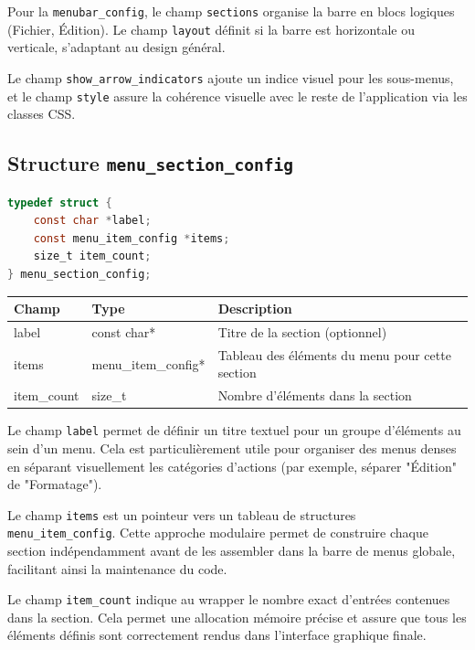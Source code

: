 Pour la \texttt{menubar\_config}, le champ \texttt{sections} organise la barre en blocs logiques (Fichier, Édition). Le champ \texttt{layout} définit si la barre est horizontale ou verticale, s'adaptant au design général. 

Le champ \texttt{show\_arrow\_indicators} ajoute un indice visuel pour les sous-menus, et le champ \texttt{style} assure la cohérence visuelle avec le reste de l'application via les classes CSS.

\subsection{Structure \texttt{menu\_section\_config}}
\begin{lstlisting}[language=C]
typedef struct {
    const char *label;
    const menu_item_config *items;
    size_t item_count;
} menu_section_config;
\end{lstlisting}
\begin{center}
\begin{tabular}{|l|l|>{\raggedright\arraybackslash}p{6cm}|}
\hline
\textbf{Champ} & \textbf{Type} & \textbf{Description} \\
\hline
label & const char* & Titre de la section (optionnel) \\
\hline
items & menu\_item\_config* & Tableau des éléments du menu pour cette section \\
\hline
item\_count & size\_t & Nombre d'éléments dans la section \\
\hline
\end{tabular}
\end{center}

\bigskip

Le champ \texttt{label} permet de définir un titre textuel pour un groupe d'éléments au sein d'un menu. Cela est particulièrement utile pour organiser des menus denses en séparant visuellement les catégories d'actions (par exemple, séparer "Édition" de "Formatage").

Le champ \texttt{items} est un pointeur vers un tableau de structures \texttt{menu\_item\_config}. Cette approche modulaire permet de construire chaque section indépendamment avant de les assembler dans la barre de menus globale, facilitant ainsi la maintenance du code.

Le champ \texttt{item\_count} indique au wrapper le nombre exact d'entrées contenues dans la section. Cela permet une allocation mémoire précise et assure que tous les éléments définis sont correctement rendus dans l'interface graphique finale.